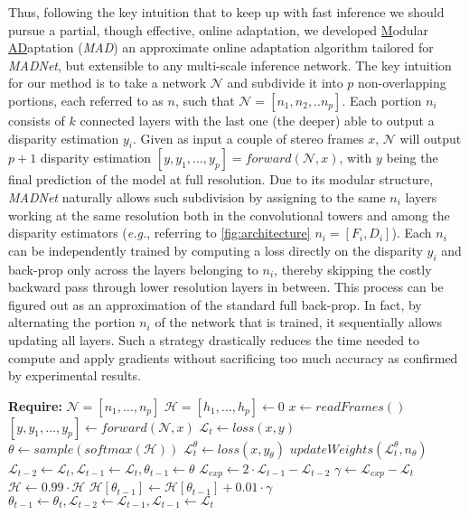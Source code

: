 \documentclass[10pt,twocolumn,letterpaper]{article}
\def\eg{\emph{e.g.}}
\def\netname{\emph{MADNet}}
\def\algoname{\emph{MAD}}
\def\extendedalgoname{\underline{M}odular \underline{AD}aptation}
\begin{document}
Thus, following the key intuition that to keep up with fast inference we should pursue a partial, though effective, online adaptation, we developed  \extendedalgoname{} (\algoname{}) an approximate online adaptation algorithm tailored for \netname{}, but extensible to any multi-scale inference network. The key intuition for our method is to take a network $\mathcal{N}$ and subdivide it into $p$ non-overlapping portions, each referred to as $n$, such that  $\mathcal{N}=[n_1,n_2,..n_p]$. Each portion $n_i$ consists of $k$ connected layers with the last one (the deeper) able to output a disparity estimation $y_i$.  Given as input a couple of stereo frames $x$, $\mathcal{N}$ will output $p+1$ disparity estimation $[y,y_1,\dots,y_p]=forward(\mathcal{N},x)$, with $y$ being the final prediction of the model at full resolution. Due to its modular structure, \netname{} naturally allows such subdivision by assigning to the same $n_i$ layers working at the same resolution both in the convolutional towers and among the disparity estimators (\eg, referring to \autoref{fig:architecture} $n_i=[F_i,D_i]$). Each $n_i$ can be independently trained by computing a loss directly on the disparity $y_i$ and back-prop only across the layers belonging to $n_i$, thereby skipping the costly backward pass through lower resolution layers in between. This process can be figured out as an approximation of the standard full back-prop. In fact, by alternating the portion $n_i$ of the network that is trained, it sequentially allows updating all layers. Such a strategy drastically reduces the time needed to compute and apply gradients without sacrificing too much accuracy as confirmed by experimental results.

\begin{algorithm}
	\caption{Independent online training of \netname{}}
	\label{cod:algo}
	\begin{algorithmic}[1] 
		\State \textbf{Require:} $\mathcal{N}=[n_1,\dots,n_p]$ 
		\State $\mathcal{H}=[h_1,\dots, h_p] \gets 0$
		\State $ x \gets readFrames() $
		\State $ [y,y_1,\dots,y_p] \gets forward(\mathcal{N},x) $
		\State $ \mathcal{L}_{t} \gets loss(x,y) $
		\State $ \theta \gets sample(softmax(\mathcal{H})) $
		\State $ \mathcal{L}^\theta_t \gets loss(x,y_{\theta}) $
		\State $ updateWeights(\mathcal{L}^{\theta}_t,n_\theta) $
		\State $ \mathcal{L}_{t-2} \gets \mathcal{L}_t, \mathcal{L}_{t-1} \gets \mathcal{L}_t, \theta_{t-1} \gets \theta $
		\EndIf
		\State $ \mathcal{L}_{exp} \gets 2 \cdot \mathcal{L}_{t-1} - \mathcal{L}_{t-2} $
		\State $ \gamma \gets \mathcal{L}_{exp} - \mathcal{L}_{t} $
		\State $ \mathcal{H} \gets 0.99 \cdot \mathcal{H} $
		\State $ \mathcal{H}[\theta_{t-1}] \gets \mathcal{H}[\theta_{t-1}] + 0.01 \cdot \gamma $
		\State $ \theta_{t-1} \gets \theta_{t}, \mathcal{L}_{t-2} \gets \mathcal{L}_{t-1}, \mathcal{L}_{t-1} \gets \mathcal{L}_{t} $
		\EndWhile	 
	\end{algorithmic}
\end{algorithm}
\end{document}
